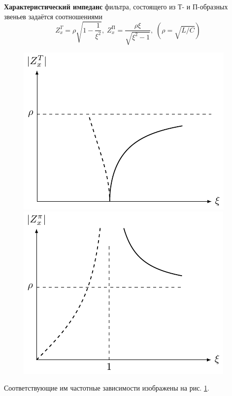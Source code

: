 \textbf{Характеристический импеданс} фильтра, состоящего из Т- и П-образных звеньев задаётся соотношениями
\begin{equation}
Z^T_x=\rho\sqrt{1-\frac{1}{\xi^2}},\;
Z^{\text{П}}_x=\frac{\rho\xi}{\sqrt{\xi^2-1}},\;
(\rho=\sqrt{L/C})
\end{equation}
\begin{figure}[h!]
	\begin{minipage}{0.49\linewidth}
		\centering
		\includegraphics[]{chem/FHF/ZxP2.pdf}
	\end{minipage}
	\begin{minipage}{0.49\linewidth}
		\centering
		\includegraphics[]{chem/FHF/ZxT2.pdf}
	\end{minipage}
	\caption{}
	\label{fig:6.3}
\end{figure}
Соответствующие им частотные зависимости изображены на рис. \ref{fig:6.3}.


